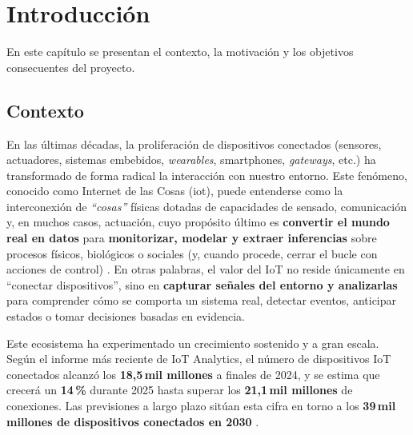 \documentclass{report}
\author{alumno  Adriano García-Giralda Milena\\ \\Director1:María José Rodríguez Fortiz \\ Director2:María del Campo Bermúdez Edo}
\date{January 2026}
\begin{document}
 



\tableofcontents %


\listoffigures %




\chapter{Introducción}
\label{chap:introduccion}

En este capítulo se presentan el contexto, la motivación y los objetivos consecuentes del proyecto. 


\section{Contexto}
En las últimas décadas, la proliferación de dispositivos conectados (sensores, actuadores, sistemas embebidos, \textit{wearables}, smartphones, \textit{gateways}, etc.) ha transformado de forma radical la interacción con nuestro entorno. Este fenómeno, conocido como Internet de las Cosas (\gls{iot}), puede entenderse como la interconexión de \emph{``cosas''} físicas dotadas de capacidades de sensado, comunicación y, en muchos casos, actuación, cuyo propósito último es \textbf{convertir el mundo real en datos} para \textbf{monitorizar, modelar y extraer inferencias} sobre procesos físicos, biológicos o sociales (y, cuando procede, cerrar el bucle con acciones de control) \cite{atzori2010iot,gubbi2013iot,choudhary2024iotoverview}. 
En otras palabras, el valor del IoT no reside únicamente en ``conectar dispositivos'', sino en \textbf{capturar señales del entorno y analizarlas} para comprender cómo se comporta un sistema real, detectar eventos, anticipar estados o tomar decisiones basadas en evidencia.

Este ecosistema ha experimentado un crecimiento sostenido y a gran escala. Según el informe más reciente de IoT Analytics, el número de dispositivos IoT conectados alcanzó los \textbf{18,5\,mil millones} a finales de 2024, y se estima que crecerá un \textbf{14\,\%} durante 2025 hasta superar los \textbf{21,1\,mil millones} de conexiones. Las previsiones a largo plazo sitúan esta cifra en torno a los \textbf{39\,mil millones de dispositivos conectados en 2030} \cite{iotanalyticsconnecteddevices2025}. 
\end{document}
